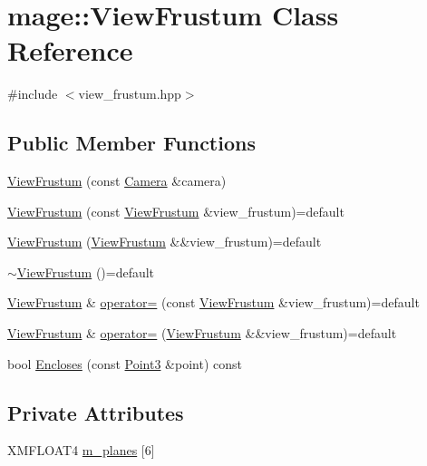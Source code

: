 \hypertarget{classmage_1_1_view_frustum}{}\section{mage\+:\+:View\+Frustum Class Reference}
\label{classmage_1_1_view_frustum}


{\ttfamily \#include $<$view\+\_\+frustum.\+hpp$>$}

\subsection*{Public Member Functions}
\begin{DoxyCompactItemize}
\item 
\hyperlink{classmage_1_1_view_frustum_ad1fd4a59f6cd0fd38289e66d4c6b5d51}{View\+Frustum} (const \hyperlink{classmage_1_1_camera}{Camera} \&camera)
\item 
\hyperlink{classmage_1_1_view_frustum_abbd4ec6c2766d3f630bce16cefa8bc4d}{View\+Frustum} (const \hyperlink{classmage_1_1_view_frustum}{View\+Frustum} \&view\+\_\+frustum)=default
\item 
\hyperlink{classmage_1_1_view_frustum_a3568cfa6a5d440455867eb11b88a5213}{View\+Frustum} (\hyperlink{classmage_1_1_view_frustum}{View\+Frustum} \&\&view\+\_\+frustum)=default
\item 
\hyperlink{classmage_1_1_view_frustum_aaa0e10f5401370909694e923c58323a9}{$\sim$\+View\+Frustum} ()=default
\item 
\hyperlink{classmage_1_1_view_frustum}{View\+Frustum} \& \hyperlink{classmage_1_1_view_frustum_add514821f691117c0ab139c13f86ef70}{operator=} (const \hyperlink{classmage_1_1_view_frustum}{View\+Frustum} \&view\+\_\+frustum)=default
\item 
\hyperlink{classmage_1_1_view_frustum}{View\+Frustum} \& \hyperlink{classmage_1_1_view_frustum_a0167f34c3ba505155ed6064c6d98a99c}{operator=} (\hyperlink{classmage_1_1_view_frustum}{View\+Frustum} \&\&view\+\_\+frustum)=default
\item 
bool \hyperlink{classmage_1_1_view_frustum_a290ee7b311278ed4701203859773aa42}{Encloses} (const \hyperlink{structmage_1_1_point3}{Point3} \&point) const
\end{DoxyCompactItemize}
\subsection*{Private Attributes}
\begin{DoxyCompactItemize}
\item 
X\+M\+F\+L\+O\+A\+T4 \hyperlink{classmage_1_1_view_frustum_aa5d8b90bfc005bd19566983401ccd511}{m\+\_\+planes} \mbox{[}6\mbox{]}
\end{DoxyCompactItemize}


